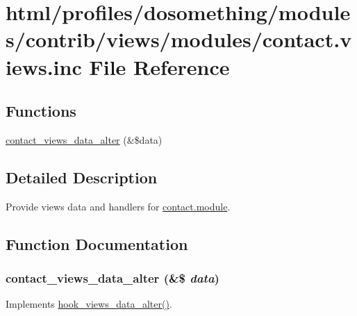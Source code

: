 \hypertarget{contact_8views_8inc}{
\section{html/profiles/dosomething/modules/contrib/views/modules/contact.views.inc File Reference}
\label{contact_8views_8inc}
}
\subsection*{Functions}
\begin{DoxyCompactItemize}
\item 
\hyperlink{contact_8views_8inc_a8d6248c129ede70e127420e9b8cf4a24}{contact\_\-views\_\-data\_\-alter} (\&\$data)
\end{DoxyCompactItemize}


\subsection{Detailed Description}
Provide views data and handlers for \hyperlink{contact_8module}{contact.module}. 

\subsection{Function Documentation}
\hypertarget{contact_8views_8inc_a8d6248c129ede70e127420e9b8cf4a24}{
\subsubsection[{contact\_\-views\_\-data\_\-alter}]{\setlength{\rightskip}{0pt plus 5cm}contact\_\-views\_\-data\_\-alter (\&\$ {\em data})}}
\label{contact_8views_8inc_a8d6248c129ede70e127420e9b8cf4a24}
Implements \hyperlink{group__views__hooks_ga6ae0bb0d2385e03c32b57625b6d35826}{hook\_\-views\_\-data\_\-alter()}. 